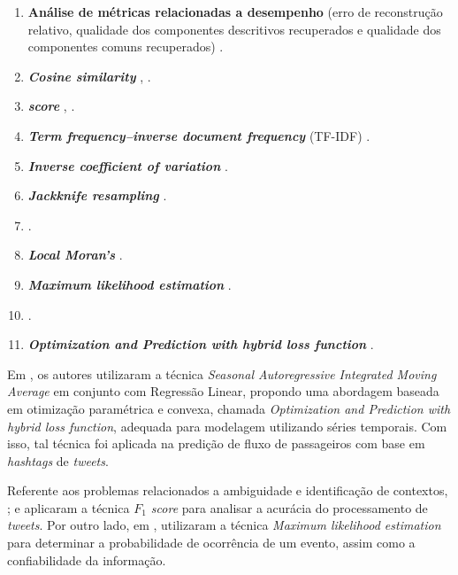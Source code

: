 \documentclass[
	12pt,				%
	oneside,			%
	a4paper,			%
	english,			%
	brazil				%
	]{abntex2ppgsi}
\begin{document}
{{\begin{enumerate}
\item \textbf{Análise de métricas relacionadas a desempenho} (erro de reconstrução relativo, qualidade dos componentes descritivos recuperados e qualidade dos componentes comuns recuperados) \cite{Wen2016}.
\item \textit{\textbf{Cosine similarity}} \cite{Yousaf2014}, \cite{Frias-Martinez2014}.
\item \textbf{\textit{ score}} \cite{Anantharam2015}, \cite{Chen2016}.
\item \textit{\textbf{Term frequency–inverse document frequency}} (TF-IDF) \cite{Mukherjee2015}.
\item \textit{\textbf{Inverse coefficient of variation}} \cite{Bendler2014}.
\item \textit{\textbf{Jackknife resampling}} \cite{Bendler2014}.
\item {} \cite{Steiger2015Census}.
\item \textit{\textbf{Local Moran's}} \cite{Steiger2015Census}.
\item \textit{\textbf{Maximum likelihood estimation}} \cite{Mukherjee2015}.
\item {} \cite{Ni2016}.
\item \textit{\textbf{Optimization and Prediction with hybrid loss function}} \cite{Ni2016}.
\end{enumerate}
 
Em \cite{Ni2016}, os autores utilizaram a técnica \textit{Seasonal Autoregressive Integrated Moving Average} em conjunto com Regressão Linear, propondo uma abordagem baseada em otimização paramétrica e convexa, chamada \textit{Optimization and Prediction with hybrid loss function}, adequada para modelagem utilizando séries temporais. Com isso, tal técnica foi aplicada na predição de fluxo de passageiros com base em \textit{hashtags} de \textit{tweets}.  

Referente aos problemas relacionados a ambiguidade e identificação de contextos, \cite{Anantharam2015}; \cite{Chen2016} e \cite{Gal-Tzur2014} aplicaram a técnica \textit{${F_1}$ score} para analisar a acurácia do processamento de \textit{tweets}. Por outro lado, em \cite{Mukherjee2015}, utilizaram a técnica \textit{Maximum likelihood estimation} para determinar a probabilidade de ocorrência de um evento, assim como a confiabilidade da informação.

}}
\end{document}
